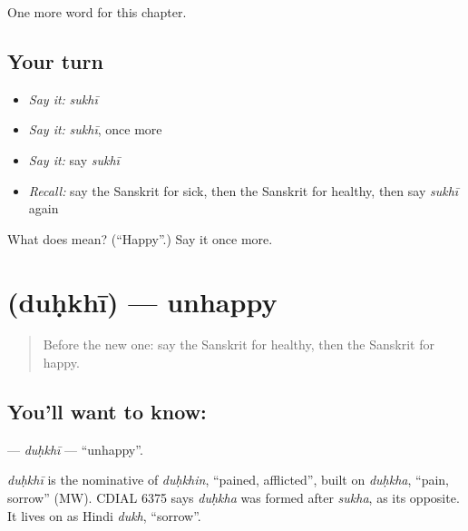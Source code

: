 \begin{grammarlens}[title={What you've built}]
One more word for this chapter.
\end{grammarlens}

\subsection*{Your turn}
\begin{itemize}
\raggedright
  \item \emph{Say it:} \emph{sukhī}
  \item \emph{Say it:} \emph{sukhī}, once more
  \item \emph{Say it:} say \emph{sukhī}
  \item \emph{Recall:} say the Sanskrit for sick, then the Sanskrit for healthy, then say \emph{sukhī} again
\end{itemize}

\begin{tcolorbox}[breakable,colback=teal!4,colframe=teal!35!black,title={Before you move on}]
What does  mean? (\textquotedblleft{}Happy\textquotedblright{}.) Say it once more.
\end{tcolorbox}
\section[\texorpdfstring{\sk{दुःखी} (duḥkhī)}{दुःखी (duḥkhī)}]{ (duḥkhī) — unhappy}

\label{lesson:SA-C243-duhkhi}



\begin{quote}
Before the new one: say the Sanskrit for healthy, then the Sanskrit for happy.
\end{quote}

\subsection*{You'll want to know: }
\textbf{} — \emph{duḥkhī} — \textquotedblleft{}unhappy\textquotedblright{}.

\begin{cousinweb}
\emph{duḥkhī} is the nominative of \emph{duḥkhin}, \textquotedblleft{}pained, afflicted\textquotedblright{}, built on \emph{duḥkha}, \textquotedblleft{}pain, sorrow\textquotedblright{} (MW). CDIAL 6375 says \emph{duḥkha} was formed after \emph{sukha}, as its opposite. It lives on as Hindi \emph{dukh}, \textquotedblleft{}sorrow\textquotedblright{}.
\end{cousinweb}


